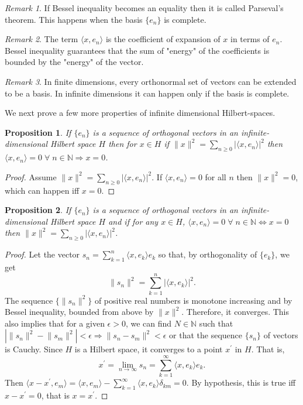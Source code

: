 \documentclass{article}
\theoremstyle{plain}
\numberwithin{thm}{section}
\theoremstyle{plain}
\newtheorem{prop}{Proposition}
\numberwithin{prop}{section}
\theoremstyle{definition}
\numberwithin{defn}{section}
\theoremstyle{remark}
\newtheorem*{rem}{Remark}
\numberwithin{equation}{section}
\begin{document}
\begin{rem}
If Bessel inequality becomes an equality then it is called Parseval's theorem.
This happens when the basis $\{e_n\}$ is complete. 
\end{rem}

\begin{rem}
The term $\langle x, e_n\rangle$ is the coefficient of expansion of $x$ in
terms of $e_n$. Bessel inequality guarantees that the sum of "energy" of the
coefficients is bounded by the "energy" of the vector.
\end{rem}

\begin{rem}
In finite dimensions, every orthonormal set of vectors can be extended to be a
basis. In infinite dimensions it can happen only if the basis is complete.
\end{rem}

We next prove a few more properties of infinite dimensional Hilbert-spaces.
\begin{prop}\label{s3p1}
If $\{e_n\}$ is a sequence of orthogonal vectors in an infinite-dimensional
Hilbert space $H$ then for $x \in H$ if $\lVert x \rVert^2 = 
\sum_{n \ge 0}|\langle x, e_n\rangle|^2$ then $\langle x, e_n\rangle=0 
\;\forall\; n \in \mathbb{N} \Rightarrow x = 0$.
\end{prop}
\begin{proof}
Assume $\lVert x \rVert^2 = \sum_{n \ge 0} |\langle x, e_n\rangle|^2$. If 
$\langle x, e_n\rangle = 0$ for all $n$ then $\lVert x \rVert^2 = 0$, which
can happen iff $x = 0$.
\end{proof}

\begin{prop}\label{s3p2}
If $\{e_n\}$ is a sequence of orthogonal vectors in an infinite-dimensional
Hilbert space $H$ and if for any $x \in H$, $\langle x, e_n\rangle = 0 \;
\forall\; n \in \mathbb{N} \Leftrightarrow x = 0$ then $\lVert x \rVert^2 = 
\sum_{n \ge 0}|\langle x, e_n\rangle|^2$.
\end{prop}
\begin{proof}
Let the vector $s_n = \sum_{k=1}^n\langle x, e_k\rangle e_k$ so that, by 
orthogonality of $\{e_k\}$, we get
\[
\lVert s_n\rVert^2 = \sum_{k=1}^n|\langle x, e_k\rangle|^2.
\]
The sequence $\{\lVert s_n\rVert^2\}$ of positive real numbers is monotone 
increasing and by Bessel inequality, bounded from above by $\lVert x \rVert^2$.
Therefore, it converges. This also implies that for a given $\epsilon > 0$,
we can find $N \in \mathbb{N}$ such that $|\lVert s_n \rVert^2 - \lVert s_m
\rVert^2| < \epsilon \Rightarrow \lVert s_n - s_m \rVert^2 < \epsilon$ or that
the sequence $\{s_n\}$ of vectors is Cauchy. Since $H$ is a Hilbert space, it
converges to a point $x^\prime$ in $H$. That is,
\[
x^\prime = \lim_{n \rightarrow \infty} s_n = 
\sum_{k=1}^\infty \langle x, e_k\rangle e_k.
\]
Then $\langle x - x^\prime, e_m\rangle = \langle x, e_m \rangle - 
\sum_{k=1}^\infty \langle x, e_k\rangle \delta_{km} = 0$. By hypothesis, this
is true iff $x - x^\prime = 0$, that is $x = x^\prime$.
\end{proof}
\end{document}
